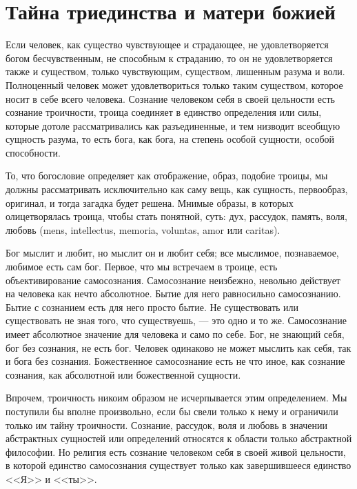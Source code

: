 \documentclass[12pt,oneside]{book}
\begin{document}
\chapter{Тайна триединства и матери божией}


Если человек, как существо чувствующее и страдающее, не удовлетворяется богом бесчувственным, не способным к страданию, то он не удовлетворяется также и существом, только чувствующим, существом, лишенным разума и воли. Полноценный человек может удовлетвориться только таким существом, которое носит в себе всего человека. Сознание человеком себя в своей цельности есть сознание троичности, троица соединяет в единство определения или силы, которые дотоле рассматривались как разъединенные, и тем низводит всеобщую сущность разума, то есть бога, как бога, на степень особой сущности, особой способности.

То, что богословие определяет как отображение, образ, подобие троицы, мы должны рассматривать исключительно как саму вещь, как сущность, первообраз, оригинал, и тогда загадка будет решена. Мнимые образы, в которых олицетворялась троица, чтобы стать понятной, суть: дух, рассудок, память, воля, любовь (mens, intellectus, memoria, voluntas, amor или caritas).

Бог мыслит и любит, но мыслит он и любит себя; все мыслимое, познаваемое, любимое есть сам бог. Первое, что мы встречаем в троице, есть объективирование самосознания. Самосознание неизбежно, невольно действует на человека как нечто абсолютное. Бытие для него равносильно самосознанию. Бытие с сознанием есть для него просто бытие. Не существовать или существовать не зная того, что существуешь, --- это одно и то же. Самосознание имеет абсолютное значение для человека и само по себе. Бог, не знающий себя, бог без сознания, не есть бог. Человек одинаково не может мыслить как себя, так и бога без сознания. Божественное самосознание есть не что иное, как сознание сознания, как абсолютной или божественной сущности.

Впрочем, троичность никоим образом не исчерпывается этим определением. Мы поступили бы вполне произвольно, если бы свели только к нему и ограничили только им тайну троичности. Сознание, рассудок, воля и любовь в значении абстрактных сущностей или определений относятся к области только абстрактной философии. Но религия есть сознание человеком себя в своей живой цельности, в которой единство самосознания существует только как завершившееся единство <<Я>> и <<ты>>.
\end{document}
